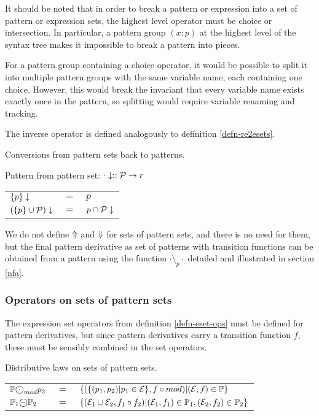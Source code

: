 It should be noted that in order to break a pattern or expression into a set of
pattern or expression sets, the highest level operator must be choice or
intersection. In particular, a pattern group $(x:p)$ at the highest level of the
syntax tree makes it impossible to break a pattern into pieces.

For a pattern group containing a choice operator, it would be possible to split
it into multiple pattern groups with the same variable name, each containing one
choice. However, this would break the invariant that every variable name exists
exactly once in the pattern, so splitting would require variable renaming and
tracking.

The inverse operator is defined analogously to definition \ref{defn-re2esets}.

\begin{defn}
   \label{defn-re2psets}
   Conversions from pattern sets back to patterns.

   Pattern from pattern set:
   $\cdot\downarrow :: \mathcal{P} \to r$

   \begin{tabular}{lll}
      $\{p\}\downarrow$			& $=$	& $p$				\\
      $(\{p\} \cup \mathcal{P})\downarrow$	& $=$	& $p \cap \mathcal{P}\downarrow$	\\
   \end{tabular}
\end{defn}

We do not define $\Uparrow$ and $\Downarrow$ for sets of pattern sets, and
there is no need for them, but the final pattern derivative as set of patterns
with transition functions can be obtained from a pattern using the function
$\cdot \setminus_p \cdot$ detailed and illustrated in section \ref{nfa}.


\subsubsection{Operators on sets of pattern sets}

The expression set operators from definition \ref{defn-eset-ops} must be defined
for pattern derivatives, but since pattern derivatives carry a transition
function $f$, these must be sensibly combined in the set operators.

\begin{defn}
   \label{defn-pset-ops}
   Distributive laws on sets of pattern sets.

   \begin{tabular}{lll}
      $\psets \circledcdot_{mod} p_2$
         & $=$
         & $\{ (\{ (p_1, p_2) | p_1 \in \mathcal{E} \}, f \circ mod) | (\mathcal{E}, f) \in \mathbb{P} \}$
         \\

      $\mathbb{P}_1 \text{\textcircled{\tiny$\cap$}} \mathbb{P}_2$
         & $=$
         & $\{
              (\mathcal{E}_1 \cup \mathcal{E}_2, f_1 \circ f_2)
              | (\mathcal{E}_1, f_1) \in \mathbb{P}_1, (\mathcal{E}_2, f_2) \in \mathbb{P}_2
           \}$
         \\
   \end{tabular}
\end{defn}

